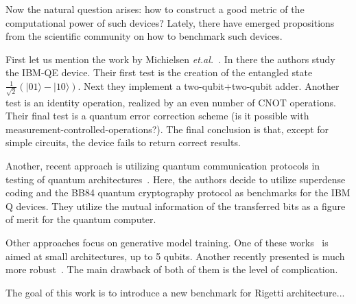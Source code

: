 \documentclass[preprint,12pt, a4paper]{elsarticle}
\newcommand{\ket}[1]{\ensuremath{|#1\rangle}}
\newcommand{\1}{{\rm 1\hspace{-0.9mm}l}}
\begin{document}

%
%	


Now the natural question arises: how to construct a good metric of the
computational power of such devices? 
Lately, there have emerged propositions from the scientific community on how to
benchmark such devices.

 First let us mention the work by Michielsen
\emph{et.al.}~\cite{michielsen2017benchmarking}. In there the authors study the
IBM-QE device. Their first test is the creation of the entangled state
$\frac{1}{\sqrt{2}} (\ket{01} - \ket{10})$. Next they implement a
two-qubit+two-qubit adder. Another test is an identity operation, realized by an
even number of CNOT operations. Their final test is a quantum error correction
scheme (is it possible with measurement-controlled-operations?). The final
conclusion is that, except for simple circuits, the device fails to return
correct results.

Another, recent approach is utilizing quantum communication protocols in testing
of quantum architectures~\cite{zhukov2019quantum}. Here, the authors decide to
utilize superdense coding and the BB84 quantum cryptography protocol as
benchmarks for the IBM Q devices. They utilize the mutual information of the
transferred bits as a figure of merit for the quantum computer.

Other approaches focus on generative model training. One of these
works~\cite{hamilton2018generative} is aimed at small architectures, up to 5
qubits. Another recently presented is much more
robust~\cite{benedetti2018generative}. The main drawback of both of them is the
level of complication.



The goal of this work is to introduce a new benchmark for Rigetti 
architecture...


\label{}
\end{document}
